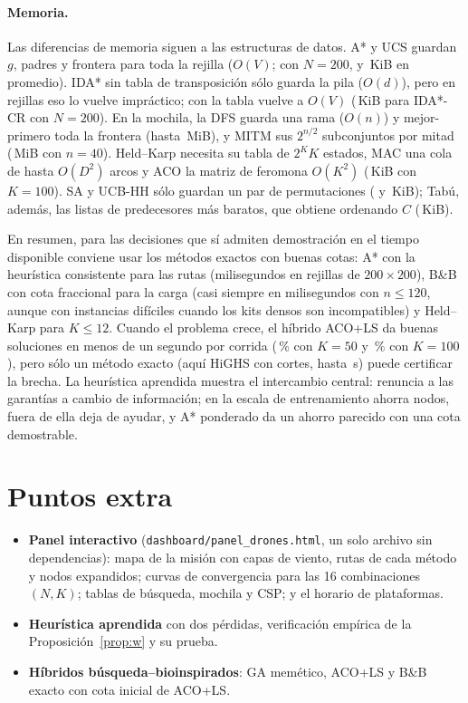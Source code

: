 \documentclass[11pt]{article}
\theoremstyle{remark}
\begin{document}
\paragraph{Memoria.} Las diferencias de memoria siguen a las estructuras de datos. A* y UCS guardan
$g$, padres y frontera para toda la rejilla ($O(V)$; con $N=200$, \memAstarNCAA{} y \memUcsNCAA\,KiB en
promedio). IDA* sin tabla de transposición sólo guarda la pila ($O(d)$), pero en rejillas eso lo
vuelve impráctico; con la tabla vuelve a $O(V)$ (\memIdaCrNCAA\,KiB para IDA*-CR con $N=200$). En la
mochila, la DFS guarda una rama ($O(n)$) y mejor-primero toda la frontera (hasta \bnbBestMemMax\,MiB),
y MITM sus $2^{n/2}$ subconjuntos por mitad (\mitmMem\,MiB con $n=40$). Held--Karp necesita su tabla de
$2^K K$ estados, MAC una cola de hasta $O(D^2)$ arcos y ACO la matriz de feromona $O(K^2)$
(\memMetaAco\,KiB con $K=100$). SA y UCB-HH sólo guardan un par de permutaciones (\memMetaSa{} y
\memMetaUcb\,KiB); Tabú, además, las listas de predecesores más baratos, que obtiene ordenando $C$
(\memMetaTabu\,KiB).

En resumen, para las decisiones que sí admiten demostración en el tiempo disponible conviene usar
los métodos exactos con buenas cotas: A* con la heurística consistente para las rutas (milisegundos en
rejillas de $200\times200$), B\&B con cota fraccional para la carga (casi siempre en milisegundos con
$n\le120$, aunque con instancias difíciles cuando los kits densos son incompatibles) y Held--Karp para
$K\le12$. Cuando el problema crece, el híbrido ACO+LS da buenas soluciones en menos de un segundo por
corrida (\gapAcoLsKFA\,\% con $K=50$ y \gapAcoLsKBAA\,\% con $K=100$), pero sólo un método
exacto (aquí HiGHS con cortes, hasta \milpMaxT\,s) puede certificar la brecha. La heurística aprendida
muestra el intercambio central: renuncia a las garantías a cambio de información; en la escala de
entrenamiento ahorra nodos, fuera de ella deja de ayudar, y A* ponderado da un ahorro parecido con una
cota demostrable.

\section{Puntos extra}
\begin{itemize}
\item \textbf{Panel interactivo} (\texttt{dashboard/panel\_drones.html}, un solo archivo sin
dependencias): mapa de la misión con capas de viento, rutas de cada método y nodos expandidos;
curvas de convergencia para las 16 combinaciones $(N,K)$; tablas de búsqueda, mochila y CSP; y el
horario de plataformas.
\item \textbf{Heurística aprendida} con dos pérdidas, verificación empírica de la
Proposición~\ref{prop:w} y su prueba.
\item \textbf{Híbridos búsqueda--bioinspirados}: GA memético, ACO+LS y B\&B exacto con cota inicial
de ACO+LS.
\end{itemize}
\end{document}
